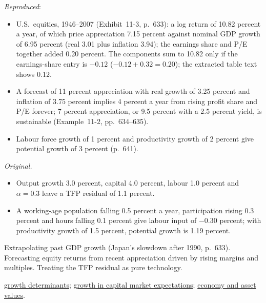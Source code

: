 \begin{qfmethod}
 \emph{Reproduced}:
\begin{itemize}
\item U.S.\ equities, 1946--2007 (Exhibit~11-3, p.~633): a log return of 10.82 percent a year, of which price appreciation 7.15 percent against nominal GDP growth of 6.95 percent (real 3.01 plus inflation 3.94); the earnings share and P/E together added 0.20 percent. The components sum to 10.82 only if the earnings-share entry is $-0.12$ ($-0.12+0.32=0.20$); the extracted table text shows 0.12.
\item A forecast of 11 percent appreciation with real growth of 3.25 percent and inflation of 3.75 percent implies 4 percent a year from rising profit share and P/E forever; 7 percent appreciation, or 9.5 percent with a 2.5 percent yield, is sustainable (Example~11-2, pp.~634--635).
\item Labour force growth of 1 percent and productivity growth of 2 percent give potential growth of 3 percent (p.~641).
\end{itemize}
\emph{Original.}
\begin{itemize}
\item Output growth 3.0 percent, capital 4.0 percent, labour 1.0 percent and $\alpha=0.3$ leave a TFP residual of 1.1 percent.
\item A working-age population falling 0.5 percent a year, participation rising 0.3 percent and hours falling 0.1 percent give labour input of $-0.30$ percent; with productivity growth of 1.5 percent, potential growth is 1.19 percent.
\end{itemize}

 Extrapolating past GDP growth (Japan's slowdown after 1990, p.~633). Forecasting equity returns from recent appreciation driven by rising margins and multiples. Treating the TFP residual as pure technology.

 \hyperref[def:growth-determinants-factors]{growth determinants}; \hyperref[meth:growth-shocks-long-run-expectations]{growth in capital market expectations}; \hyperref[res:economy-discount-rates-cash-flows]{economy and asset values}.

\end{qfmethod}

